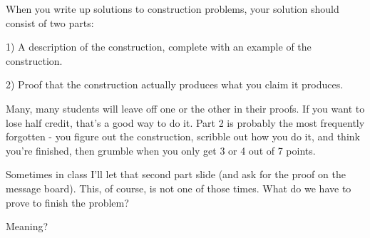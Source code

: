 When you write up solutions to construction problems, your solution should consist of two parts:

1) A description of the construction, complete with an example of the construction.

2) Proof that the construction actually produces what you claim it produces.

Many, many students will leave off one or the other in their proofs. If you want to lose half credit, that's a good way to do it. Part 2 is probably the most frequently forgotten - you figure out the construction, scribble out how you do it, and think you're finished, then grumble when you only get 3 or 4 out of 7 points.

Sometimes in class I'll let that second part slide (and ask for the proof on the message board). This, of course, is not one of those times. What do we have to prove to finish the problem?


Meaning?









